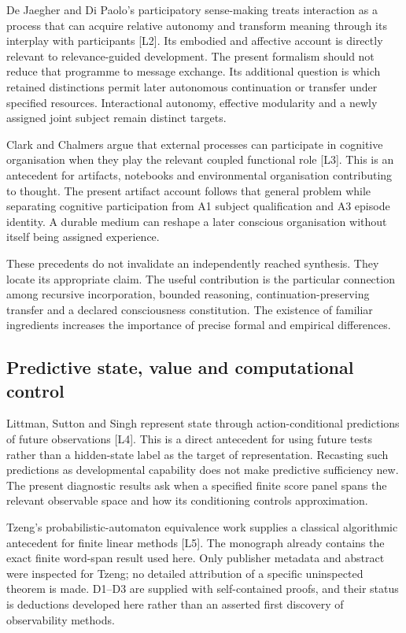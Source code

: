 \documentclass[
  11pt,
  a4paper,
]{article}
\begin{document}
De Jaegher and Di Paolo's participatory sense-making treats interaction
as a process that can acquire relative autonomy and transform meaning
through its interplay with participants {[}L2{]}. Its embodied and
affective account is directly relevant to relevance-guided development.
The present formalism should not reduce that programme to message
exchange. Its additional question is which retained distinctions permit
later autonomous continuation or transfer under specified resources.
Interactional autonomy, effective modularity and a newly assigned joint
subject remain distinct targets.

Clark and Chalmers argue that external processes can participate in
cognitive organisation when they play the relevant coupled functional
role {[}L3{]}. This is an antecedent for artifacts, notebooks and
environmental organisation contributing to thought. The present artifact
account follows that general problem while separating cognitive
participation from A1 subject qualification and A3 episode identity. A
durable medium can reshape a later conscious organisation without itself
being assigned experience.

These precedents do not invalidate an independently reached synthesis.
They locate its appropriate claim. The useful contribution is the
particular connection among recursive incorporation, bounded reasoning,
continuation-preserving transfer and a declared consciousness
constitution. The existence of familiar ingredients increases the
importance of precise formal and empirical differences.

\subsection{Predictive state, value and computational
control}\label{predictive-state-value-and-computational-control}

Littman, Sutton and Singh represent state through action-conditional
predictions of future observations {[}L4{]}. This is a direct antecedent
for using future tests rather than a hidden-state label as the target of
representation. Recasting such predictions as developmental capability
does not make predictive sufficiency new. The present diagnostic results
ask when a specified finite score panel spans the relevant observable
space and how its conditioning controls approximation.

Tzeng's probabilistic-automaton equivalence work supplies a classical
algorithmic antecedent for finite linear methods {[}L5{]}. The monograph
already contains the exact finite word-span result used here. Only
publisher metadata and abstract were inspected for Tzeng; no detailed
attribution of a specific uninspected theorem is made. D1--D3 are
supplied with self-contained proofs, and their status is deductions
developed here rather than an asserted first discovery of observability
methods.
\end{document}
